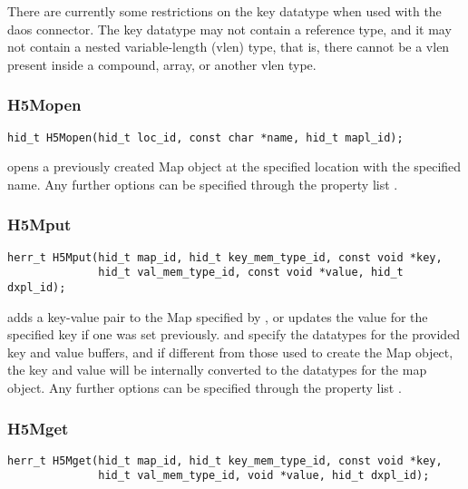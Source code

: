 \documentclass[../design_doc.tex]{subfiles}
\begin{document}
There are currently some restrictions on the key datatype when used with the \acrshort{daos} \gls{connector}. The key datatype may not contain a reference type, and it may not contain a nested variable-length (vlen) type, that is, there cannot be a vlen present inside a compound, array, or another vlen type.

\subsubsection{H5Mopen}

\begin{verbatim}
hid_t H5Mopen(hid_t loc_id, const char *name, hid_t mapl_id);
\end{verbatim}

 opens a previously created Map object at the specified location with the specified name. Any further options can be specified through the property list .

\subsubsection{H5Mput}

\begin{verbatim}
herr_t H5Mput(hid_t map_id, hid_t key_mem_type_id, const void *key,
              hid_t val_mem_type_id, const void *value, hid_t dxpl_id);
\end{verbatim}

 adds a key-value pair to the Map specified by , or updates the value for the specified key if one was set previously.  and  specify the datatypes for the provided key and value buffers, and if different from those used to create the Map object, the key and value will be internally converted to the datatypes for the map object. Any further options can be specified through the property list .

\subsubsection{H5Mget}

\begin{verbatim}
herr_t H5Mget(hid_t map_id, hid_t key_mem_type_id, const void *key,
              hid_t val_mem_type_id, void *value, hid_t dxpl_id);
\end{verbatim}
\end{document}
